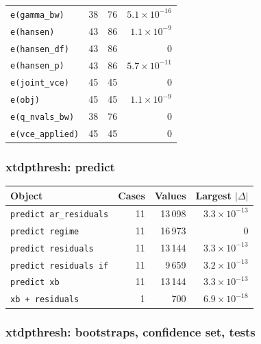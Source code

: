 \begin{longtable}{@{}p{8.2cm}rrr@{}}
\texttt{e(gamma\_\allowbreak{}bw)} & 38 & 76 & $5.1\times10^{-16}$ \\
\texttt{e(hansen)} & 43 & 86 & $1.1\times10^{-9}$ \\
\texttt{e(hansen\_\allowbreak{}df)} & 43 & 86 & 0 \\
\texttt{e(hansen\_\allowbreak{}p)} & 43 & 86 & $5.7\times10^{-11}$ \\
\texttt{e(joint\_\allowbreak{}vce)} & 45 & 45 & 0 \\
\texttt{e(obj)} & 45 & 45 & $1.1\times10^{-9}$ \\
\texttt{e(q\_\allowbreak{}nvals\_\allowbreak{}bw)} & 38 & 76 & 0 \\
\texttt{e(vce\_\allowbreak{}applied)} & 45 & 45 & 0 \\
\bottomrule
\end{longtable}

\subsubsection*{xtdpthresh: predict}

\begin{longtable}{@{}p{8.2cm}rrr@{}}
\toprule
Object & Cases & Values & Largest $|\Delta|$ \\
\midrule
\endhead
\texttt{predict ar\_\allowbreak{}residuals} & 11 & 13\,098 & $3.3\times10^{-13}$ \\
\texttt{predict regime} & 11 & 16\,973 & 0 \\
\texttt{predict residuals} & 11 & 13\,144 & $3.3\times10^{-13}$ \\
\texttt{predict residuals if} & 11 & 9\,659 & $3.2\times10^{-13}$ \\
\texttt{predict xb} & 11 & 13\,144 & $3.3\times10^{-13}$ \\
\texttt{xb + residuals} & 1 & 700 & $6.9\times10^{-18}$ \\
\bottomrule
\end{longtable}

\subsubsection*{xtdpthresh: bootstraps, confidence set, tests}

